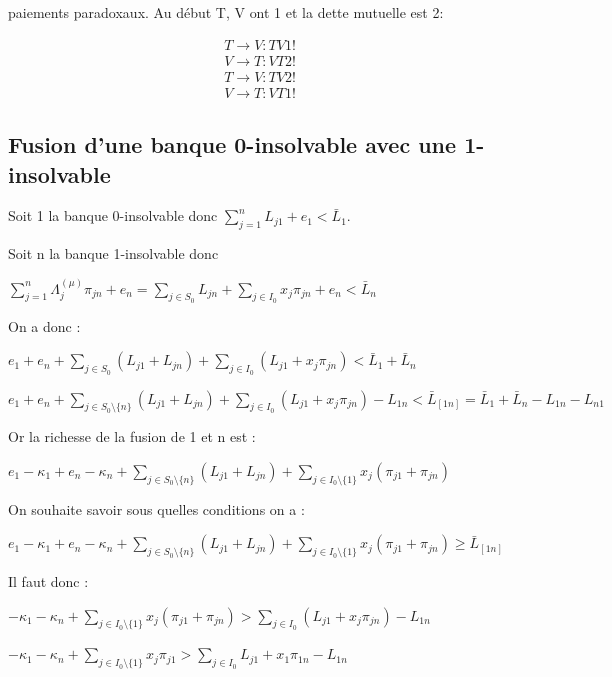 \documentclass{article}
\def\AR#1{
\[
\begin{array}{llllllll}
#1
\end{array}
\]
}
\begin{document}
paiements paradoxaux. Au début T, V ont 1 et la dette mutuelle est 2:
\AR{
T\to V: TV1!
\\
V\to T: VT2!
\\
T\to V: TV2!
\\
V\to T: VT1!
}


\subsection{Fusion d'une banque 0-insolvable avec une 1-insolvable}

Soit 1 la banque 0-insolvable donc 
$\sum_{j=1}^{n} L_{j1} + e_{1} < \bar L_{1}$.

Soit n la banque 1-insolvable donc 

$\sum_{j=1}^{n} \Lambda^{(\mu)}_{j} \pi_{jn} + e_{n} = \sum_{j \in S_{0}} L_{jn} + \sum_{j \in I_{0}} x_{j} \pi_{jn} + e_{n} < \bar L_{n}$

On a donc :

$e_{1} + e_{n} + \sum_{j \in S_{0}} (L_{j1} + L_{jn}) + \sum_{j \in I_{0}} (L_{j1} + x_{j} \pi_{jn})  < \bar L_{1} +\bar L_{n}$ 

$e_{1} + e_{n} + \sum_{j \in S_{0}\setminus \lbrace n \rbrace} (L_{j1} + L_{jn}) + \sum_{j \in I_{0}} (L_{j1} + x_{j} \pi_{jn}) - L_{1n} < \bar L_{\left[1n \right]} = \bar L_{1} +\bar L_{n} - L_{1n} - L_{n1}$

Or la richesse de la fusion de 1 et n est : 

$e_{1} - \kappa_{1} + e_{n} - \kappa_{n} + \sum_{j \in S_{0}\setminus \lbrace n \rbrace} (L_{j1} + L_{jn}) + \sum_{j \in I_{0}\setminus \lbrace 1 \rbrace} x_{j}(\pi_{j1} + \pi_{jn})$

On souhaite savoir sous quelles conditions on a :

$e_{1} - \kappa_{1} + e_{n} - \kappa_{n} + \sum_{j \in S_{0}\setminus \lbrace n \rbrace} (L_{j1} + L_{jn}) + \sum_{j \in I_{0}\setminus \lbrace 1 \rbrace} x_{j}(\pi_{j1} + \pi_{jn}) \geq \bar L_{\left[1n \right]}$
 
Il faut donc : 

$- \kappa_{1} - \kappa_{n} + \sum_{j \in I_{0}\setminus \lbrace 1 \rbrace} x_{j}(\pi_{j1} + \pi_{jn}) > \sum_{j \in I_{0}} (L_{j1} + x_{j} \pi_{jn}) - L_{1n}$

$- \kappa_{1} - \kappa_{n} + \sum_{j \in I_{0}\setminus \lbrace 1 \rbrace} x_{j} \pi_{j1} > \sum_{j \in I_{0}} L_{j1} + x_{1} \pi_{1n} - L_{1n}$
\end{document}
